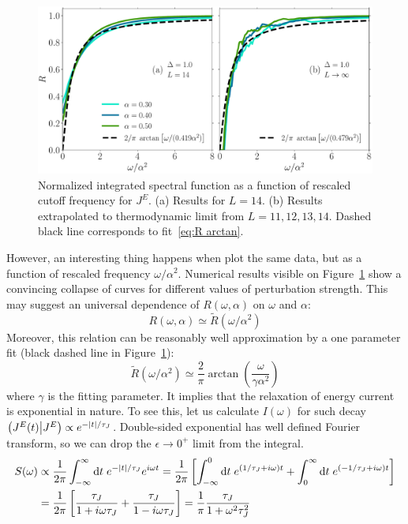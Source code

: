 \begin{figure}[htbp]
  \centering
  \includegraphics[width=\textwidth]{Figures/current_scaling.pdf}
  \caption{Normalized integrated spectral function as a function of rescaled cutoff frequency for \(J^E\).
  (a) Results for \(L=14\). (b) Results extrapolated to thermodynamic limit from \(L=11,12,13,14\).
  Dashed black line corresponds to fit~\eqref{eq:R arctan}.}
  \label{fig:current decay scaling}
\end{figure}
However, an interesting thing happens when plot the same data, but as a function of rescaled
frequency \(\omega/\alpha^2\). Numerical results visible on Figure~\ref{fig:current decay scaling}
show a convincing collapse of curves for different values of perturbation strength. This may suggest
an universal dependence of \(R(\omega,\alpha)\) on \(\omega\) and \(\alpha\):
\begin{equation}
  R(\omega,\alpha)\simeq \tilde{R}(\omega/\alpha^2)
  \label{eq:universal scaling current}
\end{equation}
Moreover, this relation can be reasonably well approximation by a one parameter fit
(black dashed line in Figure~\ref{fig:current decay scaling}):
\begin{equation}
  \tilde{R}(\omega/\alpha^2) \simeq \frac{2}{\pi} \arctan\left(\frac{\omega}{\gamma \alpha^2}\right)
\label{eq:R arctan}
\end{equation}
where \(\gamma \) is the fitting parameter. It implies that the relaxation of energy current
is exponential in nature. To see this, let us calculate \(I(\omega)\) for such decay
\(\left(J^E(t) \middle| J^E\right) \propto e^{-\abs{t}/\tau_{J}}\). Double-sided exponential has well defined Fourier
transform, so we can drop the \(\epsilon \to 0^{+}\) limit from the integral.
\begin{align}
  S(\omega) &\propto \frac{1}{2\pi} \int_{-\infty}^{\infty} \mathrm{d} t\; e^{-\abs{t}/\tau_{J}} e^{i \omega t} = 
  \frac{1}{2\pi} \left[\int_{-\infty}^{0} \mathrm{d} t\; e^{(1/\tau_{J} + i\omega)t }
  + \int_{0}^{\infty} \mathrm{d} t\; e^{(-1/\tau_{J} + i\omega)t }  \right] \nonumber \\
  &= \frac{1}{2\pi} \left[\frac{\tau_{J}}{1+i\omega \tau_{J}} + \frac{\tau_{J}}{1-i\omega\tau_{J}}\right] = 
  \frac{1}{\pi} \frac{\tau_{J}}{1+\omega^2\tau_{J}^2}
\end{align}
